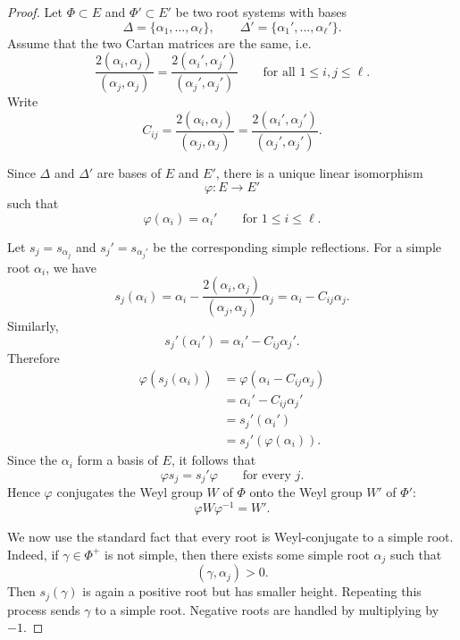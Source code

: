 \begin{proof}
    Let \(\Phi\subset E\) and \(\Phi'\subset E'\) be two root systems with bases
    \[
        \Delta=\{\alpha_1,\ldots,\alpha_\ell\},
        \qquad
        \Delta'=\{\alpha_1',\ldots,\alpha_\ell'\}.
    \]
    Assume that the two Cartan matrices are the same, i.e.
    \[
        \frac{2(\alpha_i,\alpha_j)}{(\alpha_j,\alpha_j)}
        =
        \frac{2(\alpha_i',\alpha_j')}{(\alpha_j',\alpha_j')}
        \qquad
        \text{for all }1\leq i,j\leq \ell.
    \]
    Write
    \[
        C_{ij}
        =
        \frac{2(\alpha_i,\alpha_j)}{(\alpha_j,\alpha_j)}
        =
        \frac{2(\alpha_i',\alpha_j')}{(\alpha_j',\alpha_j')}.
    \]
    
    Since \(\Delta\) and \(\Delta'\) are bases of \(E\) and \(E'\), there is a unique
    linear isomorphism
    \[
        \varphi:E\longrightarrow E'
    \]
    such that
    \[
        \varphi(\alpha_i)=\alpha_i'
        \qquad
        \text{for }1\leq i\leq \ell.
    \]
    
    Let \(s_j=s_{\alpha_j}\) and \(s_j'=s_{\alpha_j'}\) be the corresponding simple
    reflections. For a simple root \(\alpha_i\), we have
    \[
        s_j(\alpha_i)
        =
        \alpha_i
        -
        \frac{2(\alpha_i,\alpha_j)}{(\alpha_j,\alpha_j)}
        \alpha_j
        =
        \alpha_i-C_{ij}\alpha_j.
    \]
    Similarly,
    \[
        s_j'(\alpha_i')
        =
        \alpha_i'-C_{ij}\alpha_j'.
    \]
    Therefore
    \[
    \begin{aligned}
        \varphi(s_j(\alpha_i))
        &=
        \varphi(\alpha_i-C_{ij}\alpha_j)        \\
        &=
        \alpha_i'-C_{ij}\alpha_j'               \\
        &=
        s_j'(\alpha_i')                         \\
        &=
        s_j'(\varphi(\alpha_i)).
    \end{aligned}
    \]
    Since the \(\alpha_i\) form a basis of \(E\), it follows that
    \[
        \varphi s_j=s_j'\varphi
        \qquad
        \text{for every }j.
    \]
    Hence \(\varphi\) conjugates the Weyl group \(W\) of \(\Phi\) onto the Weyl
    group \(W'\) of \(\Phi'\):
    \[
        \varphi W\varphi^{-1}=W'.
    \]
    
    We now use the standard fact that every root is Weyl-conjugate to a simple
    root. Indeed, if \(\gamma\in\Phi^+\) is not simple, then there exists some
    simple root \(\alpha_j\) such that
    \[
        (\gamma,\alpha_j)>0.
    \]
    Then \(s_j(\gamma)\) is again a positive root but has smaller height. Repeating
    this process sends \(\gamma\) to a simple root. Negative roots are handled by
    multiplying by \(-1\).
    

\end{proof}
